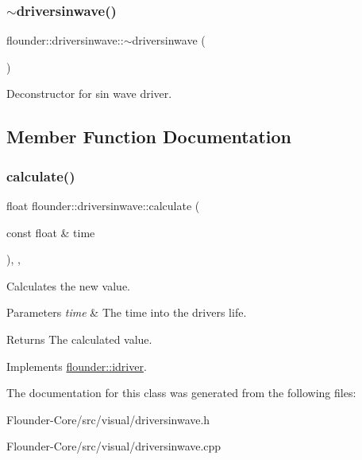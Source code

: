 \subsubsection{\texorpdfstring{$\sim$driversinwave()}{~driversinwave()}}
{\footnotesize\ttfamily flounder\+::driversinwave\+::$\sim$driversinwave (\begin{DoxyParamCaption}{ }\end{DoxyParamCaption})}



Deconstructor for sin wave driver. 



\subsection{Member Function Documentation}
\mbox{\label{classflounder_1_1driversinwave_ae5c3d8d4bd38082ad2b0396029d45e66}} 
\subsubsection{\texorpdfstring{calculate()}{calculate()}}
{\footnotesize\ttfamily float flounder\+::driversinwave\+::calculate (\begin{DoxyParamCaption}\item[{const float \&}]{time }\end{DoxyParamCaption})\hspace{0.3cm}{\ttfamily [override]}, {\ttfamily [protected]}, {\ttfamily [virtual]}}



Calculates the new value. 


\begin{DoxyParams}{Parameters}
{\em time} & The time into the drivers life. \\
\hline
\end{DoxyParams}
\begin{DoxyReturn}{Returns}
The calculated value. 
\end{DoxyReturn}


Implements \hyperlink{classflounder_1_1idriver_a034c4159dc98c4c37ffdfaae64e4a16d}{flounder\+::idriver}.



The documentation for this class was generated from the following files\+:\begin{DoxyCompactItemize}
\item 
Flounder-\/\+Core/src/visual/driversinwave.\+h\item 
Flounder-\/\+Core/src/visual/driversinwave.\+cpp\end{DoxyCompactItemize}
